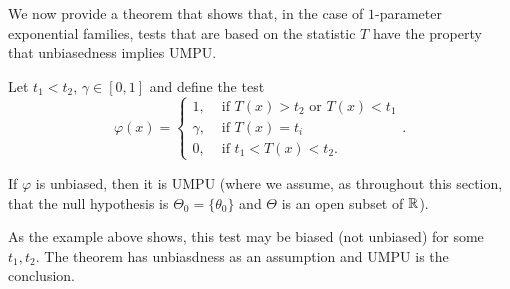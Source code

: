 \documentclass[twoside, a4paper, 10pt]{amsart}
\begin{document}
We now provide a theorem that shows that, in the case of $1$-parameter exponential families, tests that are based on the statistic $T$ have the property that unbiasedness implies UMPU.

\begin{thm} Let $t_1<t_2$, $\gamma \in [0,1]$ and define the test 
$$\varphi(x) = \begin{cases}
1, & \text{ if } T(x) > t_2 \text{ or } T(x) < t_1\\
\gamma, & \text{ if } T(x) = t_i \\  
0, & \text{ if } t_1 < T(x) < t_2.\end{cases}.$$

If $\varphi$ is unbiased, then it is UMPU (where we assume, as throughout this section, that the null hypothesis is $\Theta_0 = \{\theta_0\}$ and $\Theta$ is an open subset of $\mathbb{R}$).

\end{thm}

\begin{remark} As the example above shows, this test may be biased (not unbiased) for some $t_1,t_2$. The theorem has unbiasdness as an assumption and UMPU is the conclusion. \end{remark}
\end{document}
